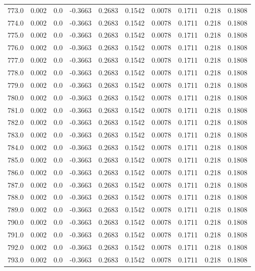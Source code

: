 \begin{longtable}{lrrrrrrrrr}
773.0 & 0.002 & 0.0 & -0.3663 & 0.2683 & 0.1542 & 0.0078 & 0.1711 & 0.218 & 0.1808 \\
774.0 & 0.002 & 0.0 & -0.3663 & 0.2683 & 0.1542 & 0.0078 & 0.1711 & 0.218 & 0.1808 \\
775.0 & 0.002 & 0.0 & -0.3663 & 0.2683 & 0.1542 & 0.0078 & 0.1711 & 0.218 & 0.1808 \\
776.0 & 0.002 & 0.0 & -0.3663 & 0.2683 & 0.1542 & 0.0078 & 0.1711 & 0.218 & 0.1808 \\
777.0 & 0.002 & 0.0 & -0.3663 & 0.2683 & 0.1542 & 0.0078 & 0.1711 & 0.218 & 0.1808 \\
778.0 & 0.002 & 0.0 & -0.3663 & 0.2683 & 0.1542 & 0.0078 & 0.1711 & 0.218 & 0.1808 \\
779.0 & 0.002 & 0.0 & -0.3663 & 0.2683 & 0.1542 & 0.0078 & 0.1711 & 0.218 & 0.1808 \\
780.0 & 0.002 & 0.0 & -0.3663 & 0.2683 & 0.1542 & 0.0078 & 0.1711 & 0.218 & 0.1808 \\
781.0 & 0.002 & 0.0 & -0.3663 & 0.2683 & 0.1542 & 0.0078 & 0.1711 & 0.218 & 0.1808 \\
782.0 & 0.002 & 0.0 & -0.3663 & 0.2683 & 0.1542 & 0.0078 & 0.1711 & 0.218 & 0.1808 \\
783.0 & 0.002 & 0.0 & -0.3663 & 0.2683 & 0.1542 & 0.0078 & 0.1711 & 0.218 & 0.1808 \\
784.0 & 0.002 & 0.0 & -0.3663 & 0.2683 & 0.1542 & 0.0078 & 0.1711 & 0.218 & 0.1808 \\
785.0 & 0.002 & 0.0 & -0.3663 & 0.2683 & 0.1542 & 0.0078 & 0.1711 & 0.218 & 0.1808 \\
786.0 & 0.002 & 0.0 & -0.3663 & 0.2683 & 0.1542 & 0.0078 & 0.1711 & 0.218 & 0.1808 \\
787.0 & 0.002 & 0.0 & -0.3663 & 0.2683 & 0.1542 & 0.0078 & 0.1711 & 0.218 & 0.1808 \\
788.0 & 0.002 & 0.0 & -0.3663 & 0.2683 & 0.1542 & 0.0078 & 0.1711 & 0.218 & 0.1808 \\
789.0 & 0.002 & 0.0 & -0.3663 & 0.2683 & 0.1542 & 0.0078 & 0.1711 & 0.218 & 0.1808 \\
790.0 & 0.002 & 0.0 & -0.3663 & 0.2683 & 0.1542 & 0.0078 & 0.1711 & 0.218 & 0.1808 \\
791.0 & 0.002 & 0.0 & -0.3663 & 0.2683 & 0.1542 & 0.0078 & 0.1711 & 0.218 & 0.1808 \\
792.0 & 0.002 & 0.0 & -0.3663 & 0.2683 & 0.1542 & 0.0078 & 0.1711 & 0.218 & 0.1808 \\
793.0 & 0.002 & 0.0 & -0.3663 & 0.2683 & 0.1542 & 0.0078 & 0.1711 & 0.218 & 0.1808 \\

\end{longtable}

